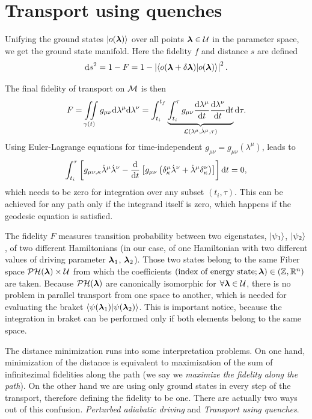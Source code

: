 \section{Transport using quenches}
\label{sec:quenches}
Unifying the ground states $\ket{o({\bm\lambda})}$ over all points ${\bm\lambda}\in\mathcal U$ in the parameter space, we get the ground state manifold. Here the fidelity $f$ and distance $s$ are defined
\begin{equation}
    \mathrm{d} s^2 = 1-F = 1-\left|\braket{o(\bm{{\bm\lambda}}+\delta\bm{{\bm\lambda}})|o(\bm{{\bm\lambda}})}\right|^2.
    \label{eq:distanceOnM0_1}
\end{equation}

The final fidelity of transport on $\mathcal{M}$ is then
\begin{equation}
    F=\iint\limits_{\gamma(t)} g_{\mu\nu}\mathrm{d}\lambda^\mu\mathrm{d}\lambda^\nu = \int_{t_i}^{t_f}\underbrace{\int_{t_i}^\tau g_{\mu\nu}\frac{\mathrm{d} \lambda^\mu}{\mathrm{d} t}\frac{\mathrm{d} \lambda^\nu}{\mathrm{d} t} \mathrm{d} t}_{\mathcal{L}(\lambda^\mu,\dot\lambda^\mu,\tau)}\mathrm{d} \tau .
\end{equation}
Using Euler-Lagrange equations for time-independent $g_{\mu\nu}=g_{\mu\nu}(\lambda^\mu)$, leads to
\begin{equation}
    \int_{t_i}^{\tau}\left[g_{\mu\nu,\kappa}\dot\lambda^\mu\dot\lambda^\nu - \frac{\mathrm{d} }{\mathrm{d} t}\left[g_{\mu\nu}\left(\delta^\mu_\kappa\dot\lambda^\nu+\dot\lambda^\mu\delta^\nu_\kappa\right)\right]\right]\mathrm{d} t=0,
\end{equation}
which needs to be zero for integration over any subset $(t_i,\tau)$. This can be achieved for any path only if the integrand itself is zero, which happens if the geodesic equation is satisfied.

The fidelity $F$ measures transition probability between two eigenstates, $\ket{\psi_1}$, $\ket{\psi_2}$, of two different Hamiltonians (in our case, of one Hamiltonian with two different values of driving parameter ${\bm\lambda}_1$, ${\bm\lambda}_2$). Those two states belong to the same Fiber space $\mathcal{PH}({\bm\lambda})\times \mathcal U$ from which the coefficients $(\text{index of energy state}; {\bm\lambda})\in (\mathbb{Z},\mathbb{R}^n)$ are taken. Because $\mathcal{PH}({\bm\lambda})$ are canonically isomorphic for $\forall {\bm\lambda}\in \mathcal U$, there is no problem in parallel transport from one space to another, which is needed for evaluating the braket $\braket{\psi({\bm\lambda}_1)|\psi({\bm\lambda}_2)}$. This is important notice, because the integration in braket can be performed only if both elements belong to the same space.

The distance minimization runs into some interpretation problems. On one hand, minimization of the distance is equivalent to maximization of the sum of infinitezimal fidelities along the path (we say we \emph{maximize the fidelity along the path}). On the other hand we are using only ground states in every step of the transport, therefore defining the fidelity to be one. There are actually two ways out of this confusion. \emph{Perturbed adiabatic driving} and \emph{Transport using quenches}.


